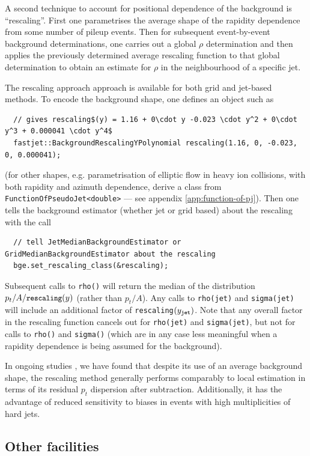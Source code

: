 \documentclass[12pt,a4]{article}
\newcommand{\ttt}[1]{{\small\texttt{#1}}}
\begin{document}
A second technique to account for positional dependence of the
background is ``rescaling''.
%
First one parametrises the average shape of the rapidity
dependence from some number of pileup events.
%
Then for subsequent event-by-event background determinations, one
carries out a global $\rho$ determination and then applies the
previously determined average rescaling function to that global
determination to obtain an estimate for $\rho$ in the neighbourhood of
a specific jet.

The rescaling approach approach is available for both grid and
jet-based methods.
%
To encode the background shape, one defines an object such as 
\begin{lstlisting}
  // gives rescaling$(y) = 1.16 + 0\cdot y -0.023 \cdot y^2 + 0\cdot y^3 + 0.000041 \cdot y^4$
  fastjet::BackgroundRescalingYPolynomial rescaling(1.16, 0, -0.023, 0, 0.000041);
\end{lstlisting}
(for other shapes, e.g. parametrisation of elliptic flow in heavy ion
collisions, with both rapidity and azimuth dependence, derive a class
from \ttt{FunctionOfPseudoJet<double>} --- see appendix
\ref{app:function-of-pj}). Then one tells the background estimator
(whether jet or grid based) about the rescaling with the call
\begin{lstlisting}
  // tell JetMedianBackgroundEstimator or GridMedianBackgroundEstimator about the rescaling
  bge.set_rescaling_class(&rescaling);
\end{lstlisting}
Subsequent calls to \ttt{rho()} will return the median of the
distribution $p_t/A / \ttt{rescaling}(y)$ (rather than $p_t/A$).
%
Any calls to \ttt{rho(jet)} and \ttt{sigma(jet)} will include an
additional factor of \ttt{rescaling}$(y_\ttt{jet})$.
%
Note that any overall factor in the rescaling function cancels out for
\ttt{rho(jet)} and \ttt{sigma(jet)}, but not for calls to \ttt{rho()}
and \ttt{sigma()} (which are in any case less meaningful when a
rapidity dependence is being assumed for the background).

In ongoing studies \cite{GridMedianLH}, we have found that despite its
use of an average background shape, the rescaling method generally
performs comparably to local estimation in terms of its residual $p_t$
dispersion after subtraction.
%
Additionally, it has the advantage of reduced sensitivity to biases in
events with high multiplicities of hard jets.

\subsection{Other facilities}
\label{sec:BGE-other-facilities}
\end{document}

